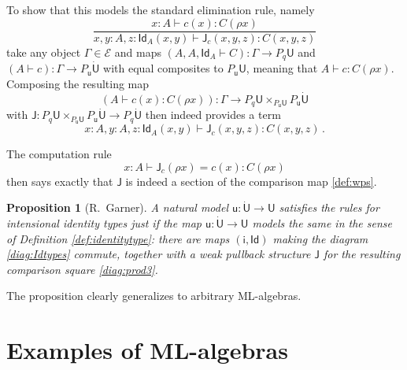 \documentclass[12pt,reqno]{amsart}
\newcommand{\EE}{\ensuremath{\mathcal{E}}}
\renewcommand{\to}{\ensuremath{\rightarrow}}
\newcommand{\Id}{\mathsf{Id}}
\renewcommand{\t}{\ensuremath{\mathsf{u}}}
\newcommand{\T}{\ensuremath{\mathsf{U}}}
\newcommand{\TT}{\ensuremath{\dot{\mathsf{U}}}}
\newtheorem{proposition}[theorem]{Proposition}
\theoremstyle{remark}
\theoremstyle{definition}
\begin{document}
To show that this models the standard elimination rule, namely
\[
\frac{x:A\vdash c(x) : C(\rho x)}{x, y:A, z : \Id_A(x, y)\vdash \mathsf{J}_c(x,y,z) : C(x,y,z)}
\]
take any object $\Gamma \in \EE$  and maps $(A, A, \Id_{A} \vdash C) : \Gamma \to P_q\T$ and $(A \vdash c) : \Gamma \to P_\t\TT$ with equal composites to $P_\t\T$, meaning that $A \vdash c : C(\rho x)$.  Composing the resulting map 
\[
(A\vdash c(x):C(\rho x)) : \Gamma \to P_q\T \times_{P_\t\T} P_\t\TT
\]
with $\mathsf{J} : P_q\T \times_{P_\t\T} P_\t\TT \to P_q \TT$ then indeed provides a term $$x:A, y:A, z:\Id_{A}(x,y)  \vdash \mathsf{J}_c(x,y,z) : C(x,y,z)\,.$$

The computation rule
\[
x: A \vdash \mathsf{J}_c(\rho x) = c(x) : C(\rho x)
\]
then says exactly that $\mathsf{J}$ is indeed a section of the comparison map \eqref{def:wps}.

\begin{proposition}[R.\ Garner]\label{prop:Id-typesfromML}  A natural model $\t : \TT \to \T$ satisfies the rules for intensional identity types just if the map $\t : \TT \to \T$ \emph{models} the same in the sense of Definition \ref{def:identitytype}: there are maps $(\mathsf{i}, \Id)$ making the diagram \eqref{diag:Idtypes} commute, together with a weak pullback structure $\mathsf{J}$ for the resulting comparison square \eqref{diag:prod3}.
\end{proposition}

The proposition clearly generalizes to arbitrary ML-algebras.

\section{Examples of ML-algebras}\label{sec:ExamplesML-Algebras}
\end{document}
